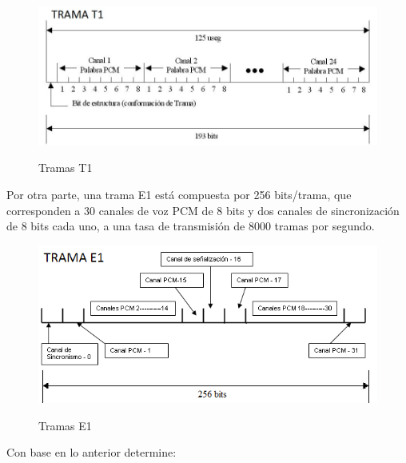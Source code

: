 \begin{enumerate}
\begin{enumerate}
\begin{figure}[h!]
	\captionsetup{justification = raggedright, singlelinecheck = false}
	\caption{Tramas T1} 
	\centering
	\includegraphics[scale=0.65]{Imagenes/tramat1.png}
	\label{fig:tramat1}
\end{figure}	
	Por otra parte, una trama E1 está compuesta por 256 bits/trama, que corresponden a 30 canales de voz PCM de 8 bits y dos canales de sincronización de 8 bits cada uno, a una tasa de transmisión de 8000 tramas por segundo. 
	

\begin{figure}[h!]
	\captionsetup{justification = raggedright, singlelinecheck = false}
	\caption{Tramas E1} 
	\centering
	\includegraphics[scale=1.0]{Imagenes/tramae1.png}
	\label{fig:tramae1}
\end{figure}		
	Con base en lo anterior determine:
	

\end{enumerate}
\end{enumerate}
